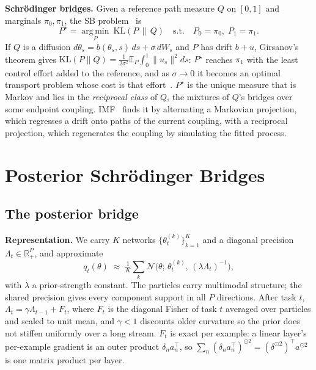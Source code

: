 \documentclass{article}
\newcommand{\KL}{\mathrm{KL}}
\newcommand{\Rb}{\mathbb{R}}
\newcommand{\Eb}{\mathbb{E}}
\newcommand{\Nc}{\mathcal{N}}
\newcommand{\thk}{\theta_t^{(k)}}
\begin{document}
\textbf{Schr\"odinger bridges.} Given a reference path measure $Q$ on $[0,1]$ and
marginals $\pi_0,\pi_1$, the SB problem~\cite{leonard2014survey} is
\begin{equation}
P^\star=\operatorname*{arg\,min}_{P}\ \KL(P\,\|\,Q)
\quad\text{s.t.}\quad P_0=\pi_0,\;P_1=\pi_1 .
\label{eq:sb}
\end{equation}
If $Q$ is a diffusion $d\theta_s=b(\theta_s,s)\,ds+\sigma\,dW_s$ and $P$ has
drift $b+u$, Girsanov's theorem gives
$\KL(P\|Q)=\tfrac{1}{2\sigma^2}\Eb_P\!\int_0^1\|u_s\|^2 ds$: $P^\star$ reaches
$\pi_1$ with the least control effort added to the reference, and as
$\sigma\to0$ it becomes an optimal transport problem whose cost is that
effort~\cite{leonard2014survey}. $P^\star$ is the unique measure that
is Markov and lies in the \emph{reciprocal class} of $Q$, the mixtures of $Q$'s
bridges over some endpoint coupling. IMF~\cite{shi2023dsbm,peluchetti2023idbm}
finds it by alternating a Markovian projection, which regresses a drift onto
paths of the current coupling, with a reciprocal projection, which regenerates
the coupling by simulating the fitted process.

\section{Posterior Schr\"odinger Bridges}
\label{sec:method}

\subsection{The posterior bridge}
\label{sec:bridge}

\textbf{Representation.} We carry $K$ networks $\{\thk\}_{k=1}^K$ and a
diagonal precision $\Lambda_t\in\Rb^P_{+}$, and approximate
\begin{equation}
q_t(\theta)\;\approx\;\tfrac1K\textstyle\sum_{k}\Nc\big(\theta;\,\thk,\,(\lambda\Lambda_t)^{-1}\big),
\label{eq:mixture}
\end{equation}
with $\lambda$ a prior-strength constant. The particles carry multimodal
structure; the shared precision gives every component support in all $P$
directions. After task $t$, $\Lambda_t=\gamma\Lambda_{t-1}+F_t$, where $F_t$ is
the diagonal Fisher of task $t$ averaged over particles and scaled to unit mean,
and $\gamma<1$ discounts older curvature so the prior does not stiffen uniformly
over a long stream. $F_t$ is exact per example: a linear layer's per-example
gradient is an outer product $\delta_n a_n^{\top}$, so
$\sum_n(\delta_n a_n^{\top})^{\odot2}=(\delta^{\odot2})^{\top}a^{\odot2}$ is
one matrix product per layer.
\end{document}
